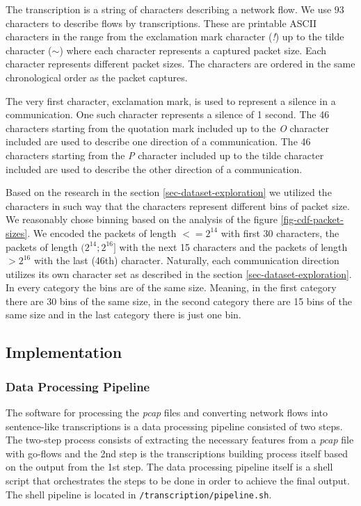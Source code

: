 \documentclass{article}
\begin{document}
    The transcription is a string of characters describing a network flow. We use 93 characters to describe flows by transcriptions. These are printable ASCII characters in the range from the exclamation mark character (\textit{!}) up to the tilde character (\textit{$\sim$}) where each character represents a captured packet size. Each character represents different packet sizes. The characters are ordered in the same chronological order as the packet captures.

    The very first character, exclamation mark, is used to represent a silence in a communication. One such character represents a silence of 1 second. The 46 characters starting from the quotation mark included up to the \textit{O} character included are used to describe one direction of a communication. The 46 characters starting from the \textit{P} character included up to the tilde character included are used to describe the other direction of a communication.

    Based on the research in the section \ref{sec-dataset-exploration} we utilized the characters in such way that the characters represent different bins of packet size. We reasonably chose binning based on the analysis of the figure \ref{fig-cdf-packet-sizes}. We encoded the packets of length $<= 2^{14}$ with first 30 characters, the packets of length $(2^{14}; 2^{16}]$ with the next 15 characters and the packets of length $> 2^{16}$ with the last (46th) character. Naturally, each communication direction utilizes its own character set as described in the section \ref{sec-dataset-exploration}. In every category the bins are of the same size. Meaning, in the first category there are 30 bins of the same size, in the second category there are 15 bins of the same size and in the last category there is just one bin.


    \subsection{Implementation}

    \subsubsection{Data Processing Pipeline}
    The software for processing the \textit{pcap} files and converting network flows into sentence-like transcriptions is a data processing pipeline consisted of two steps. The two-step process consists of extracting the necessary features from a \textit{pcap} file with go-flows and the 2nd step is the transcriptions building process itself based on the output from the 1st step. The data processing pipeline itself is a shell script that orchestrates the steps to be done in order to achieve the final output. The shell pipeline is located in \verb|/transcription/pipeline.sh|.
\end{document}
